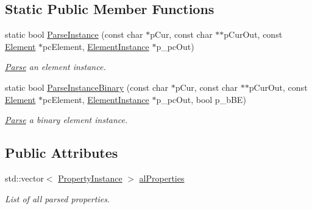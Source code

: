 \subsection*{Static Public Member Functions}
\begin{DoxyCompactItemize}
\item 
\hypertarget{class_assimp_1_1_p_l_y_1_1_element_instance_a74289dcf255f92ebfe8b9cfd7c2f96c6}{static bool \hyperlink{class_assimp_1_1_p_l_y_1_1_element_instance_a74289dcf255f92ebfe8b9cfd7c2f96c6}{Parse\+Instance} (const char $\ast$p\+Cur, const char $\ast$$\ast$p\+Cur\+Out, const \hyperlink{class_assimp_1_1_p_l_y_1_1_element}{Element} $\ast$pc\+Element, \hyperlink{class_assimp_1_1_p_l_y_1_1_element_instance}{Element\+Instance} $\ast$p\+\_\+pc\+Out)}\label{class_assimp_1_1_p_l_y_1_1_element_instance_a74289dcf255f92ebfe8b9cfd7c2f96c6}

\begin{DoxyCompactList}\small\item\em \hyperlink{struct_parse}{Parse} an element instance. \end{DoxyCompactList}\item 
\hypertarget{class_assimp_1_1_p_l_y_1_1_element_instance_aabb1dd2eee0db6c8f3c959451737d854}{static bool \hyperlink{class_assimp_1_1_p_l_y_1_1_element_instance_aabb1dd2eee0db6c8f3c959451737d854}{Parse\+Instance\+Binary} (const char $\ast$p\+Cur, const char $\ast$$\ast$p\+Cur\+Out, const \hyperlink{class_assimp_1_1_p_l_y_1_1_element}{Element} $\ast$pc\+Element, \hyperlink{class_assimp_1_1_p_l_y_1_1_element_instance}{Element\+Instance} $\ast$p\+\_\+pc\+Out, bool p\+\_\+b\+B\+E)}\label{class_assimp_1_1_p_l_y_1_1_element_instance_aabb1dd2eee0db6c8f3c959451737d854}

\begin{DoxyCompactList}\small\item\em \hyperlink{struct_parse}{Parse} a binary element instance. \end{DoxyCompactList}\end{DoxyCompactItemize}
\subsection*{Public Attributes}
\begin{DoxyCompactItemize}
\item 
\hypertarget{class_assimp_1_1_p_l_y_1_1_element_instance_a4b74207479cc77662d7fa5c905bd9d5f}{std\+::vector$<$ \hyperlink{class_assimp_1_1_p_l_y_1_1_property_instance}{Property\+Instance} $>$ \hyperlink{class_assimp_1_1_p_l_y_1_1_element_instance_a4b74207479cc77662d7fa5c905bd9d5f}{al\+Properties}}\label{class_assimp_1_1_p_l_y_1_1_element_instance_a4b74207479cc77662d7fa5c905bd9d5f}

\begin{DoxyCompactList}\small\item\em List of all parsed properties. \end{DoxyCompactList}\end{DoxyCompactItemize}



